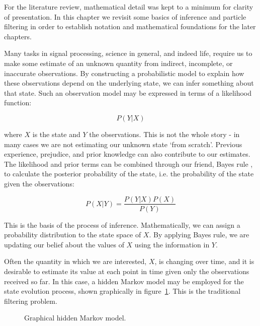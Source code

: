 For the literature review, mathematical detail was kept to a minimum for clarity of presentation. In this chapter we revisit some basics of inference and particle filtering in order to establish notation and mathematical foundations for the later chapters.

Many tasks in signal processing, science in general, and indeed life, require us to make some estimate of an unknown quantity from indirect, incomplete, or inaccurate observations. By constructing a probabilistic model to explain how these observations depend on the underlying state, we can infer something about that state. Such an observation model may be expressed in terms of a likelihood function:

\begin{equation}
P(Y|X)
\label{eq:LH}
\end{equation}

where $X$ is the state and $Y$ the observations. This is not the whole story - in many cases we are not estimating our unknown state `from scratch'. Previous experience, prejudice, and prior knowledge can also contribute to our estimates. The likelihood and prior terms can be combined through our friend, Bayes rule \cite{Bayes1763,Laplace1774}, to calculate the posterior probability of the state, i.e. the probability of the state given the observations:

\begin{equation}
P(X|Y) = \frac{P(Y|X)P(X)}{P(Y)}
\label{eq:BayesRule}
\end{equation}

This is the basis of the process of inference. Mathematically, we can assign a probability distribution to the state space of $X$. By applying Bayes rule, we are updating our belief about the values of $X$ using the information in $Y$.

Often the quantity in which we are interested, $X$, is changing over time, and it is desirable to estimate its value at each point in time given only the observations received so far. In this case, a hidden Markov model may be employed for the state evolution process, shown graphically in figure~\ref{fig:HMM}. This is the traditional filtering problem. %

\begin{figure}[hbt]%

\caption{Graphical hidden Markov model.}%
\label{fig:HMM}%
\end{figure}

